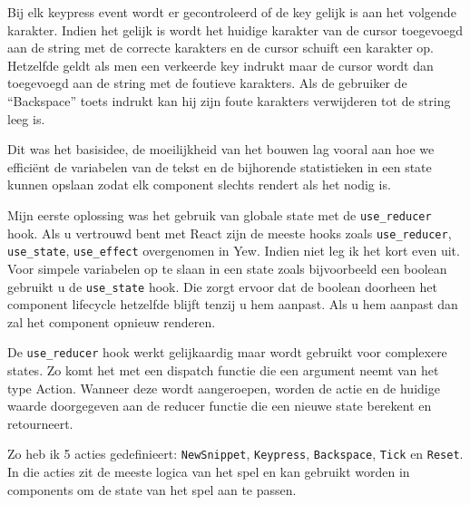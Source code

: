 Bij elk keypress event wordt er gecontroleerd of de key gelijk is aan het volgende karakter. Indien
het gelijk is wordt het huidige karakter van de cursor toegevoegd aan de string met de correcte
karakters en de cursor schuift een karakter op. Hetzelfde geldt als men een verkeerde key indrukt
maar de cursor wordt dan toegevoegd aan de string met de foutieve karakters. Als de gebruiker de
“Backspace” toets indrukt kan hij zijn foute karakters verwijderen tot de string leeg is. 

\clearpage

Dit was het basisidee, de moeilijkheid van het bouwen lag vooral aan hoe we efficiënt de variabelen
van de tekst en de bijhorende statistieken in een state kunnen opslaan zodat elk component slechts
rendert als het nodig is.  

Mijn eerste oplossing was het gebruik van globale state met de \texttt{use_reducer}
hook. Als u vertrouwd bent met React zijn de meeste hooks zoals \texttt{use_reducer},
\texttt{use_state}, \texttt{use_effect} overgenomen in Yew. Indien niet leg
ik het kort even uit. Voor simpele variabelen op te slaan in een state zoals bijvoorbeeld een
boolean gebruikt u de \texttt{use_state} hook. Die zorgt ervoor dat de boolean doorheen
het component lifecycle hetzelfde blijft tenzij u hem aanpast. Als u hem aanpast dan zal het
component opnieuw renderen.  

De \texttt{use_reducer} hook werkt gelijkaardig maar wordt gebruikt voor complexere
states. Zo komt het met een dispatch functie die een argument neemt van het type Action. Wanneer
deze wordt aangeroepen, worden de actie en de huidige waarde doorgegeven aan de reducer functie die
een nieuwe state berekent en retourneert.

Zo heb ik 5 acties gedefinieert: \texttt{NewSnippet}, \texttt{Keypress},
\texttt{Backspace}, \texttt{Tick} en \texttt{Reset}. In die acties zit
de meeste logica van het spel en kan gebruikt worden in components om de state van het spel aan te
passen. 


